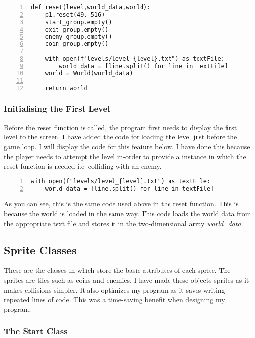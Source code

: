 \documentclass[12pt]{report}
\begin{document}
\begin{Verbatim}[numbers=left, frame=single]
def reset(level,world_data,world):
    p1.reset(49, 516)
    start_group.empty()
    exit_group.empty()
    enemy_group.empty()
    coin_group.empty()
    
    with open(f"levels/level_{level}.txt") as textFile:
        world_data = [line.split() for line in textFile]
    world = World(world_data)
    
    return world
\end{Verbatim}

\subsubsection{Initialising the First Level}
Before the reset function is called, the program first needs to display the first level to the screen. I have added the code for loading the level just before the game loop. I will display the code for this feature below. I have done this because the player needs to attempt the level in-order to provide a instance in which the reset function is needed i.e. colliding with an enemy. \label{draw method}

\begin{Verbatim}[numbers=left, frame=single]
with open(f"levels/level_{level}.txt") as textFile:
    world_data = [line.split() for line in textFile]
\end{Verbatim}

As you can see, this is the same code used above in the reset function. This is because the world is loaded in the same way. This code loads the world data from the appropriate text file and stores it in the two-dimensional array \textit{world\_data}.

\pagebreak

\subsection{Sprite Classes}
These are the classes in which store the basic attributes of each sprite. The sprites are tiles such as coins and enemies. I have made these objects sprites as it makes collisions simpler. It also optimizes my program as it saves writing repeated lines of code. This was a time-saving benefit when designing my program.

\subsubsection{The Start Class}
\end{document}
